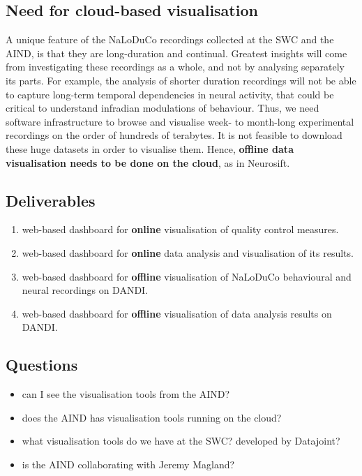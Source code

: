 
\subsection{Need for cloud-based visualisation}

A unique feature of the NaLoDuCo recordings collected at the SWC and the AIND,
is that they are long-duration and continual. Greatest insights will come from
investigating these recordings as a whole, and not by analysing separately its
parts. For example, the analysis of shorter duration recordings will not be
able to capture long-term temporal dependencies in neural activity, that could
be critical to understand infradian modulations of behaviour. Thus, we need
software infrastructure to browse and visualise week- to month-long
experimental recordings on the order of hundreds of terabytes. It is not
feasible to download these huge datasets in order to visualise them. Hence,
\textbf{offline data visualisation needs to be done on the cloud}, as in Neurosift.

\subsection{Deliverables}

\begin{enumerate}

    \item web-based dashboard for \textbf{online} visualisation of quality control
    measures.

    \item web-based dashboard for \textbf{online} data analysis and visualisation of
    its results.

    \item web-based dashboard for \textbf{offline} visualisation of NaLoDuCo
    behavioural and neural recordings on DANDI.

    \item web-based dashboard for \textbf{offline} visualisation of data analysis
    results on DANDI.

\end{enumerate}

\subsection{Questions}

\begin{itemize}

    \item can I see the visualisation tools from the AIND?

    \item does the AIND has visualisation tools running on the cloud?

    \item what visualisation tools do we have at the SWC? developed by
    Datajoint?

    \item is the AIND collaborating with Jeremy Magland?

\end{itemize}

